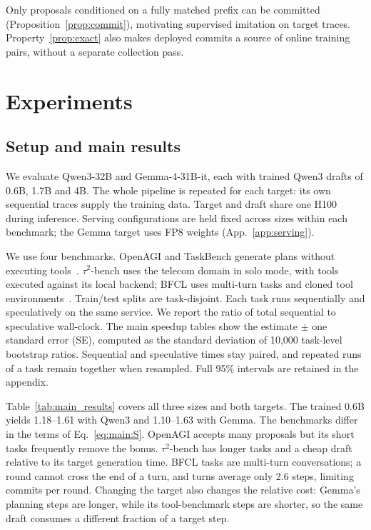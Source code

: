 Only proposals conditioned on a fully matched prefix can be committed (Proposition~\ref{prop:commit}),
motivating supervised imitation on target traces. Property~\ref{prop:exact} also makes deployed
commits a source of online training pairs, without a separate collection pass.

\section{Experiments}
\label{sec:experiments}
\subsection{Setup and main results}
\label{sec:setup}\label{sec:results4}
We evaluate Qwen3-32B and Gemma-4-31B-it, each with trained Qwen3 drafts of 0.6B, 1.7B and 4B.
The whole pipeline is repeated for each target: its own sequential traces supply the training data.
Target and draft share one H100 during inference. Serving configurations are held fixed across
sizes within each benchmark; the Gemma target uses FP8 weights (App.~\ref{app:serving}).

We use four benchmarks. OpenAGI and TaskBench generate plans without executing tools~\citep{openagi,taskbench}.
$\tau^2$-bench uses the telecom domain in solo mode, with tools executed against its local backend;
BFCL uses multi-turn tasks and cloned tool environments~\citep{tau2bench,bfcl}.
Train/test splits are task-disjoint. Each task runs sequentially and speculatively on
the same service. We report the ratio of total sequential to speculative wall-clock. The main
speedup tables show the estimate $\pm$ one standard error (SE), computed as the standard deviation
of 10,000 task-level bootstrap ratios. Sequential and speculative times stay paired, and repeated
runs of a task remain together when resampled. Full 95\% intervals are retained in the appendix.



Table~\ref{tab:main_results} covers all three sizes and both targets. The trained 0.6B yields
1.18--1.61\xx{} with Qwen3 and 1.10--1.63\xx{} with Gemma. The benchmarks differ in the terms of
Eq.~\ref{eq:main:S}. OpenAGI accepts many proposals but its short tasks frequently remove the bonus.
$\tau^2$-bench has longer tasks and a cheap draft relative to its target generation time. BFCL
tasks are multi-turn conversations; a round cannot cross the end of a turn, and turns average only
2.6 steps, limiting commits per round.
Changing the target also changes the relative cost: Gemma's planning steps are longer, while its
tool-benchmark steps are shorter, so the same draft consumes a different fraction of a target step.

